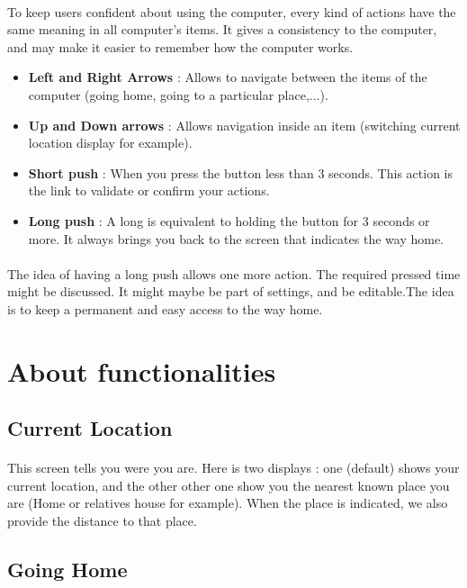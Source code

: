 \documentclass[a4paper,11pt]{article} %
\begin{document}
\paragraph{}To keep users confident about using the computer, every kind of actions have the same meaning in all computer's items. It gives a consistency to the computer, and may make it easier to remember how the computer works.
\begin{itemize}
\item \textbf{Left and Right Arrows} :  Allows to navigate between the items of the computer (going home, going to a particular place,...). 
\item \textbf{Up and Down arrows} : Allows navigation inside an item (switching current location display for example).
\item \textbf{Short push} : When you press the button less than 3 seconds. This action is the link to validate or confirm your actions.
\item \textbf{Long push}  : A long is equivalent to holding the button for 3 seconds or more. It always brings you back to the screen that indicates the way home.
\end{itemize}
\paragraph{}The idea of having a long push allows one more action. The required pressed time might be discussed. It might maybe be part of settings, and be editable.The idea is to keep a permanent and easy access to the way home. 

\section{About functionalities}
\subsection{Current Location}
\paragraph{}This screen tells you were you are. Here is two displays : one (default) shows your current location, and the other other one show you the nearest known place you are (Home or relatives house for example). When the place is indicated, we also provide the distance to that place.
\subsection{Going Home}
\end{document}
